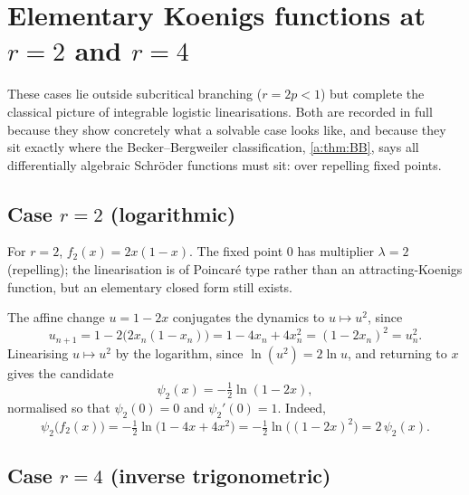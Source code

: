 \renewcommand{\thesection}{\thechapter.\Alph{section}}
\setcounter{section}{0}

\section{Elementary Koenigs functions at \texorpdfstring{$r=2$}{r=2} and \texorpdfstring{$r=4$}{r=4}}
\label{a:app:integrable}

These cases lie outside subcritical branching ($r=2p<1$) but complete the
classical picture of integrable logistic linearisations. Both are recorded in full
because they show concretely what a solvable case looks like, and because they sit
exactly where the Becker--Bergweiler classification, \cref{a:thm:BB}, says all
differentially algebraic Schr\"oder functions must sit: over repelling fixed
points.

\subsection{Case \texorpdfstring{$r=2$}{r=2} (logarithmic)}
\label{a:app:r2}

For $r=2$, $f_2(x)=2x(1-x)$. The fixed point $0$ has multiplier $\lambda=2$
(repelling); the linearisation is of Poincar\'e type rather than an
attracting-Koenigs function, but an elementary closed form still exists.

The affine change $u=1-2x$ conjugates the dynamics to $u\mapsto u^2$, since
\begin{equation*}
u_{n+1} = 1-2\bigl(2x_n(1-x_n)\bigr) = 1-4x_n+4x_n^2 = (1-2x_n)^2 = u_n^2 .
\end{equation*}
Linearising $u\mapsto u^2$ by the logarithm, since $\ln(u^2)=2\ln u$, and
returning to $x$ gives the candidate
\begin{equation}
\label{a:eq:psi2}
\psi_2(x) = -\tfrac12\ln(1-2x),
\end{equation}
normalised so that $\psi_2(0)=0$ and $\psi_2'(0)=1$. Indeed,
\begin{equation*}
\psi_2\bigl(f_2(x)\bigr)
= -\tfrac12\ln\bigl(1-4x+4x^2\bigr)
= -\tfrac12\ln\bigl((1-2x)^2\bigr)
= 2\,\psi_2(x) .
\end{equation*}

\subsection{Case \texorpdfstring{$r=4$}{r=4} (inverse trigonometric)}
\label{a:app:r4}

